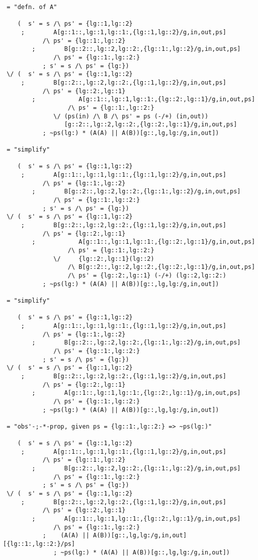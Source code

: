 \begin{verbatim}
 = "defn. of A"

    (  s' = s /\ ps' = {lg::1,lg::2}
     ;        A[g::1::,lg::1,lg::1:,{lg::1,lg::2}/g,in,out,ps]
           /\ ps' = {lg::1:,lg::2}
        ;        B[g::2::,lg::2,lg::2:,{lg::1:,lg::2}/g,in,out,ps]
              /\ ps' = {lg::1:,lg::2:}
           ; s' = s /\ ps' = {lg:})
 \/ (  s' = s /\ ps' = {lg::1,lg::2}
     ;        B[g::2::,lg::2,lg::2:,{lg::1,lg::2}/g,in,out,ps]
           /\ ps' = {lg::2:,lg::1}
        ;            A[g::1::,lg::1,lg::1:,{lg::2:,lg::1}/g,in,out,ps]
                  /\ ps' = {lg::1:,lg::2:}
              \/ (ps(in) /\ B /\ ps' = ps (-/+) (in,out))
                 [g::2::,lg::2,lg::2:,{lg::2:,lg::1}/g,in,out,ps]
           ; ~ps(lg:) * (A(A) || A(B))[g::,lg,lg:/g,in,out])

 = "simplify"

    (  s' = s /\ ps' = {lg::1,lg::2}
     ;        A[g::1::,lg::1,lg::1:,{lg::1,lg::2}/g,in,out,ps]
           /\ ps' = {lg::1:,lg::2}
        ;        B[g::2::,lg::2,lg::2:,{lg::1:,lg::2}/g,in,out,ps]
              /\ ps' = {lg::1:,lg::2:}
           ; s' = s /\ ps' = {lg:})
 \/ (  s' = s /\ ps' = {lg::1,lg::2}
     ;        B[g::2::,lg::2,lg::2:,{lg::1,lg::2}/g,in,out,ps]
           /\ ps' = {lg::2:,lg::1}
        ;            A[g::1::,lg::1,lg::1:,{lg::2:,lg::1}/g,in,out,ps]
                  /\ ps' = {lg::1:,lg::2:}
              \/     {lg::2:,lg::1}(lg::2)
                  /\ B[g::2::,lg::2,lg::2:,{lg::2:,lg::1}/g,in,out,ps]
                  /\ ps' = {lg::2:,lg::1} (-/+) (lg::2,lg::2:)
           ; ~ps(lg:) * (A(A) || A(B))[g::,lg,lg:/g,in,out])

 = "simplify"

    (  s' = s /\ ps' = {lg::1,lg::2}
     ;        A[g::1::,lg::1,lg::1:,{lg::1,lg::2}/g,in,out,ps]
           /\ ps' = {lg::1:,lg::2}
        ;        B[g::2::,lg::2,lg::2:,{lg::1:,lg::2}/g,in,out,ps]
              /\ ps' = {lg::1:,lg::2:}
           ; s' = s /\ ps' = {lg:})
 \/ (  s' = s /\ ps' = {lg::1,lg::2}
     ;        B[g::2::,lg::2,lg::2:,{lg::1,lg::2}/g,in,out,ps]
           /\ ps' = {lg::2:,lg::1}
        ;        A[g::1::,lg::1,lg::1:,{lg::2:,lg::1}/g,in,out,ps]
              /\ ps' = {lg::1:,lg::2:}
           ; ~ps(lg:) * (A(A) || A(B))[g::,lg,lg:/g,in,out])

 = "obs'-;-*-prop, given ps = {lg::1:,lg::2:} => ~ps(lg:)"

    (  s' = s /\ ps' = {lg::1,lg::2}
     ;        A[g::1::,lg::1,lg::1:,{lg::1,lg::2}/g,in,out,ps]
           /\ ps' = {lg::1:,lg::2}
        ;        B[g::2::,lg::2,lg::2:,{lg::1:,lg::2}/g,in,out,ps]
              /\ ps' = {lg::1:,lg::2:}
           ; s' = s /\ ps' = {lg:})
 \/ (  s' = s /\ ps' = {lg::1,lg::2}
     ;        B[g::2::,lg::2,lg::2:,{lg::1,lg::2}/g,in,out,ps]
           /\ ps' = {lg::2:,lg::1}
        ;        A[g::1::,lg::1,lg::1:,{lg::2:,lg::1}/g,in,out,ps]
              /\ ps' = {lg::1:,lg::2:}
           ;    (A(A) || A(B))[g::,lg,lg:/g,in,out][{lg::1:,lg::2:}/ps]
              ; ~ps(lg:) * (A(A) || A(B))[g::,lg,lg:/g,in,out])


\end{verbatim}
